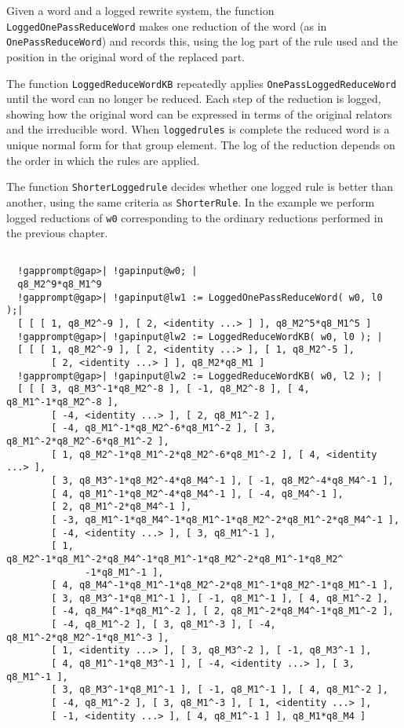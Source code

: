 \documentclass[a4paper,11pt]{report}
\begin{document}
{{{ Given a word and a logged rewrite system, the function \texttt{LoggedOnePassReduceWord} makes one reduction of the word (as in \texttt{OnePassReduceWord}) and records this, using the log part of the rule used and the position in
the original word of the replaced part. 

 The function \texttt{LoggedReduceWordKB} repeatedly applies \texttt{OnePassLoggedReduceWord} until the word can no longer be reduced. Each step of the reduction is logged,
showing how the original word can be expressed in terms of the original
relators and the irreducible word. When \texttt{loggedrules} is complete the reduced word is a unique normal form for that group element.
The log of the reduction depends on the order in which the rules are applied. 

 The function \texttt{ShorterLoggedrule} decides whether one logged rule is better than another, using the same
criteria as \texttt{ShorterRule}. In the example we perform logged reductions of \texttt{w0} corresponding to the ordinary reductions performed in the previous chapter. 

 }

 
\begin{Verbatim}[commandchars=!@|,fontsize=\small,frame=single,label=Example]
  
  !gapprompt@gap>| !gapinput@w0; |
  q8_M2^9*q8_M1^9
  !gapprompt@gap>| !gapinput@lw1 := LoggedOnePassReduceWord( w0, l0 );|
  [ [ [ 1, q8_M2^-9 ], [ 2, <identity ...> ] ], q8_M2^5*q8_M1^5 ]
  !gapprompt@gap>| !gapinput@lw2 := LoggedReduceWordKB( w0, l0 ); |
  [ [ [ 1, q8_M2^-9 ], [ 2, <identity ...> ], [ 1, q8_M2^-5 ],
        [ 2, <identity ...> ] ], q8_M2*q8_M1 ]
  !gapprompt@gap>| !gapinput@lw2 := LoggedReduceWordKB( w0, l2 ); |
  [ [ [ 3, q8_M3^-1*q8_M2^-8 ], [ -1, q8_M2^-8 ], [ 4, q8_M1^-1*q8_M2^-8 ],
        [ -4, <identity ...> ], [ 2, q8_M1^-2 ],
        [ -4, q8_M1^-1*q8_M2^-6*q8_M1^-2 ], [ 3, q8_M1^-2*q8_M2^-6*q8_M1^-2 ],
        [ 1, q8_M2^-1*q8_M1^-2*q8_M2^-6*q8_M1^-2 ], [ 4, <identity ...> ],
        [ 3, q8_M3^-1*q8_M2^-4*q8_M4^-1 ], [ -1, q8_M2^-4*q8_M4^-1 ],
        [ 4, q8_M1^-1*q8_M2^-4*q8_M4^-1 ], [ -4, q8_M4^-1 ],
        [ 2, q8_M1^-2*q8_M4^-1 ],
        [ -3, q8_M1^-1*q8_M4^-1*q8_M1^-1*q8_M2^-2*q8_M1^-2*q8_M4^-1 ],
        [ -4, <identity ...> ], [ 3, q8_M1^-1 ],
        [ 1, q8_M2^-1*q8_M1^-2*q8_M4^-1*q8_M1^-1*q8_M2^-2*q8_M1^-1*q8_M2^
              -1*q8_M1^-1 ],
        [ 4, q8_M4^-1*q8_M1^-1*q8_M2^-2*q8_M1^-1*q8_M2^-1*q8_M1^-1 ],
        [ 3, q8_M3^-1*q8_M1^-1 ], [ -1, q8_M1^-1 ], [ 4, q8_M1^-2 ],
        [ -4, q8_M4^-1*q8_M1^-2 ], [ 2, q8_M1^-2*q8_M4^-1*q8_M1^-2 ],
        [ -4, q8_M1^-2 ], [ 3, q8_M1^-3 ], [ -4, q8_M1^-2*q8_M2^-1*q8_M1^-3 ],
        [ 1, <identity ...> ], [ 3, q8_M3^-2 ], [ -1, q8_M3^-1 ],
        [ 4, q8_M1^-1*q8_M3^-1 ], [ -4, <identity ...> ], [ 3, q8_M1^-1 ],
        [ 3, q8_M3^-1*q8_M1^-1 ], [ -1, q8_M1^-1 ], [ 4, q8_M1^-2 ],
        [ -4, q8_M1^-2 ], [ 3, q8_M1^-3 ], [ 1, <identity ...> ],
        [ -1, <identity ...> ], [ 4, q8_M1^-1 ] ], q8_M1*q8_M4 ]
  

\end{Verbatim}}}
\end{document}
